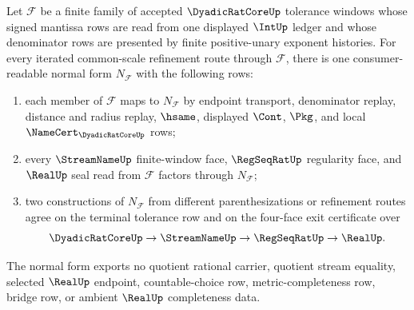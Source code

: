 \begin{theorem}
\label{thm:dyadicratcore-common-scale-terminal-refinement-directed-normal-form}
Let $\mathcal{F}$ be a finite family of accepted $\DyadicRatCoreUp$ tolerance windows whose signed mantissa rows are read from one displayed $\IntUp$ ledger and whose denominator rows are presented by finite positive-unary exponent histories. For every iterated common-scale refinement route through $\mathcal{F}$, there is one consumer-readable normal form $N_{\mathcal{F}}$ with the following rows:
\begin{enumerate}
\item each member of $\mathcal{F}$ maps to $N_{\mathcal{F}}$ by endpoint transport, denominator replay, distance and radius replay, $\hsame$, displayed $\Cont$, $\Pkg$, and local $\NameCert_{\DyadicRatCoreUp}$ rows;
\item every $\StreamNameUp$ finite-window face, $\RegSeqRatUp$ regularity face, and $\RealUp$ seal read from $\mathcal{F}$ factors through $N_{\mathcal{F}}$;
\item two constructions of $N_{\mathcal{F}}$ from different parenthesizations or refinement routes agree on the terminal tolerance row and on the four-face exit certificate over
$$
\DyadicRatCoreUp \to \StreamNameUp \to \RegSeqRatUp \to \RealUp .
$$
\end{enumerate}
The normal form exports no quotient rational carrier, quotient stream equality, selected $\RealUp$ endpoint, countable-choice row, metric-completeness row, bridge row, or ambient $\RealUp$ completeness data.
\end{theorem}
